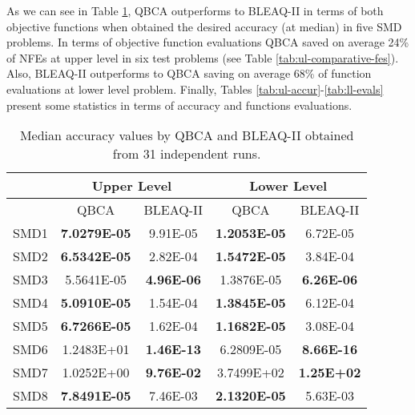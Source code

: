 \documentclass[conference]{IEEEtran}
\theoremstyle{definition}
\begin{document}
As we can see in Table \ref{tab:ll-comparative-vals}, QBCA outperforms to BLEAQ-II
in terms of both objective functions when obtained the desired accuracy (at median)
in five SMD problems. In terms of  objective function evaluations QBCA saved on
average 24\% of NFEs at upper level in six test problems (see Table \ref{tab:ul-comparative-fes}).
Also, BLEAQ-II outperforms to QBCA saving on average 68\% of function evaluations
at lower level problem. Finally, Tables \ref{tab:ul-accur}-\ref{tab:ll-evals} 
present some statistics in terms of accuracy and functions evaluations.


\begin{table}[!ht]
    \caption{Median accuracy values by QBCA and BLEAQ-II obtained from 31 independent runs.}
    \label{tab:ll-comparative-vals}
    \centering
    \begin{tabular}{|c|c|c||c|c|}
\hline
& \multicolumn{2}{c||}{Upper Level} & \multicolumn{2}{c|}{Lower Level} \\ \hline
& QBCA & BLEAQ-II & QBCA & BLEAQ-II \\ \hline
SMD1 & \textbf{7.0279E-05}  &  9.91E-05 & \textbf{1.2053E-05} &          6.72E-05 \\ \hline
SMD2 & \textbf{6.5342E-05}  &  2.82E-04 & \textbf{1.5472E-05} &          3.84E-04 \\ \hline
SMD3 & 5.5641E-05    & \textbf{4.96E-06}&          1.3876E-05 & \textbf{6.26E-06} \\ \hline
SMD4 & \textbf{5.0910E-05}  &  1.54E-04 & \textbf{1.3845E-05} &          6.12E-04 \\ \hline
SMD5 & \textbf{6.7266E-05}  &  1.62E-04 & \textbf{1.1682E-05} &          3.08E-04 \\ \hline
SMD6 & 1.2483E+01  &  \textbf{1.46E-13} &          6.2809E-05 & \textbf{8.66E-16} \\ \hline
SMD7 & 1.0252E+00  &  \textbf{9.76E-02} &          3.7499E+02 & \textbf{1.25E+02} \\ \hline
SMD8 & \textbf{7.8491E-05}  &           7.46E-03 & \textbf{2.1320E-05} &          5.63E-03 \\ \hline

    \end{tabular}
\end{table}

\end{document}
